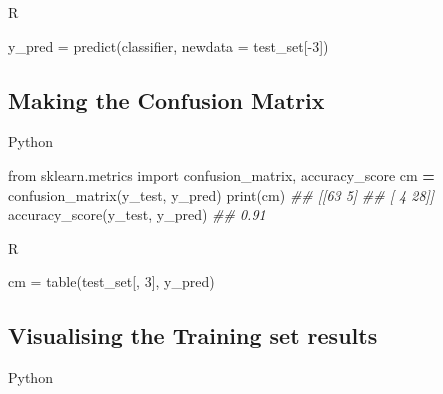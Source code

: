 \documentclass[
]{book}
\newenvironment{Shaded}{\begin{snugshade}}{\end{snugshade}}
\newcommand{\AttributeTok}[1]{\textcolor[rgb]{0.77,0.63,0.00}{#1}}
\newcommand{\BuiltInTok}[1]{#1}
\newcommand{\CommentTok}[1]{\textcolor[rgb]{0.56,0.35,0.01}{\textit{#1}}}
\newcommand{\DecValTok}[1]{\textcolor[rgb]{0.00,0.00,0.81}{#1}}
\newcommand{\FunctionTok}[1]{\textcolor[rgb]{0.00,0.00,0.00}{#1}}
\newcommand{\ImportTok}[1]{#1}
\newcommand{\NormalTok}[1]{#1}
\newcommand{\OperatorTok}[1]{\textcolor[rgb]{0.81,0.36,0.00}{\textbf{#1}}}
\newcommand{\OtherTok}[1]{\textcolor[rgb]{0.56,0.35,0.01}{#1}}
\newcommand{\SpecialCharTok}[1]{\textcolor[rgb]{0.00,0.00,0.00}{#1}}
\theoremstyle{definition}
\theoremstyle{definition}
\theoremstyle{definition}
\theoremstyle{definition}
\theoremstyle{remark}
\begin{document}
R

\begin{Shaded}
\begin{Highlighting}[]
\NormalTok{y\_pred }\OtherTok{=} \FunctionTok{predict}\NormalTok{(classifier, }\AttributeTok{newdata =}\NormalTok{ test\_set[}\SpecialCharTok{{-}}\DecValTok{3}\NormalTok{])}
\end{Highlighting}
\end{Shaded}

\hypertarget{making-the-confusion-matrix-6}{%
\subsection{Making the Confusion Matrix}\label{making-the-confusion-matrix-6}}

Python

\begin{Shaded}
\begin{Highlighting}[]
\ImportTok{from}\NormalTok{ sklearn.metrics }\ImportTok{import}\NormalTok{ confusion\_matrix, accuracy\_score}
\NormalTok{cm }\OperatorTok{=}\NormalTok{ confusion\_matrix(y\_test, y\_pred)}
\BuiltInTok{print}\NormalTok{(cm)}
\CommentTok{\#\# [[63  5]}
\CommentTok{\#\#  [ 4 28]]}
\NormalTok{accuracy\_score(y\_test, y\_pred)}
\CommentTok{\#\# 0.91}
\end{Highlighting}
\end{Shaded}

R

\begin{Shaded}
\begin{Highlighting}[]
\NormalTok{cm }\OtherTok{=} \FunctionTok{table}\NormalTok{(test\_set[, }\DecValTok{3}\NormalTok{], y\_pred)}
\end{Highlighting}
\end{Shaded}

\hypertarget{visualising-the-training-set-results-7}{%
\subsection{Visualising the Training set results}\label{visualising-the-training-set-results-7}}

Python
\end{document}

